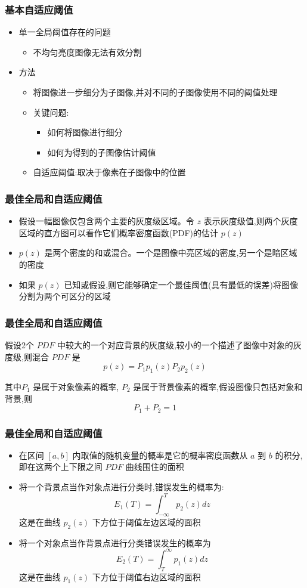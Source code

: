 \documentclass{beamer}
\begin{document}
\begin{frame}
\frametitle{基本自适应阈值}
\label{sec-4-4}

\begin{itemize}
\item 单一全局阈值存在的问题
\begin{itemize}
\item 不均匀亮度图像无法有效分割
\end{itemize}
\item 方法
\begin{itemize}
\item 将图像进一步细分为子图像,并对不同的子图像使用不同的阈值处理
\item 关键问题:
\begin{itemize}
\item 如何将图像进行细分
\item 如何为得到的子图像估计阈值
\end{itemize}
\item 自适应阈值:取决于像素在子图像中的位置
\end{itemize}
\end{itemize}
\end{frame}
\begin{frame}
\frametitle{最佳全局和自适应阈值}
\label{sec-4-5}

\begin{itemize}
\item 假设一幅图像仅包含两个主要的灰度级区域。令 $z$ 表示灰度级值,则两个灰度区域的直方图可以看作它们概率密度函数(PDF)的估计 $p(z)$
\item $p(z)$ 是两个密度的和或混合。一个是图像中亮区域的密度,另一个是暗区域的密度
\item 如果 $p(z)$ 已知或假设,则它能够确定一个最佳阈值(具有最低的误差)将图像分割为两个可区分的区域
\end{itemize}
\end{frame}
\begin{frame}
\frametitle{最佳全局和自适应阈值}
\label{sec-4-6}

 假设2个 $PDF$ 中较大的一个对应背景的灰度级,较小的一个描述了图像中对象的灰度级,则混合 $PDF$ 是
  \[ p(z) =P_1 p_1(z)P_2 p_2(z) \]
 
 其中$P_1$ 是属于对象像素的概率, $P_2$ 是属于背景像素的概率,假设图像只包括对象和背景,则
  \[ P_1+P_2=1 \]
\end{frame}
\begin{frame}
\frametitle{最佳全局和自适应阈值}
\label{sec-4-7}

\begin{itemize}
\item 在区间 $[a,b]$ 内取值的随机变量的概率是它的概率密度函数从 $a$ 到 $b$ 的积分,即在这两个上下限之间 $PDF$ 曲线围住的面积
\item 将一个背景点当作对象点进行分类时,错误发生的概率为:
      \[ E_1(T) = \int_{-\infty}^{T}p_2(z) dz \]
     这是在曲线 $p_2(z)$ 下方位于阈值左边区域的面积
\item 将一个对象点当作背景点进行分类错误发生的概率为
      \[ E_2(T) = \int_{T}^{\infty}p_1(z) dz \]
     这是在曲线 $p_1(z)$ 下方位于阈值右边区域的面积
\end{itemize}
\end{frame}
\end{document}
